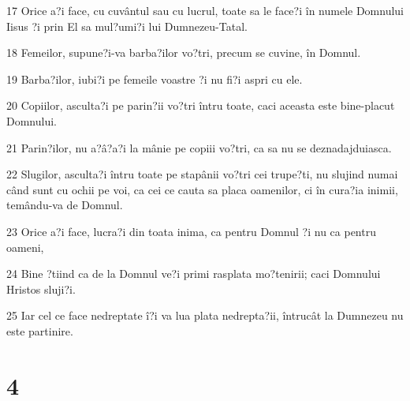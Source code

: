 \par 17 Orice a?i face, cu cuvântul sau cu lucrul, toate sa le face?i în numele Domnului Iisus ?i prin El sa mul?umi?i lui Dumnezeu-Tatal.
\par 18 Femeilor, supune?i-va barba?ilor vo?tri, precum se cuvine, în Domnul.
\par 19 Barba?ilor, iubi?i pe femeile voastre ?i nu fi?i aspri cu ele.
\par 20 Copiilor, asculta?i pe parin?ii vo?tri întru toate, caci aceasta este bine-placut Domnului.
\par 21 Parin?ilor, nu a?â?a?i la mânie pe copiii vo?tri, ca sa nu se deznadajduiasca.
\par 22 Slugilor, asculta?i întru toate pe stapânii vo?tri cei trupe?ti, nu slujind numai când sunt cu ochii pe voi, ca cei ce cauta sa placa oamenilor, ci în cura?ia inimii, temându-va de Domnul.
\par 23 Orice a?i face, lucra?i din toata inima, ca pentru Domnul ?i nu ca pentru oameni,
\par 24 Bine ?tiind ca de la Domnul ve?i primi rasplata mo?tenirii; caci Domnului Hristos sluji?i.
\par 25 Iar cel ce face nedreptate î?i va lua plata nedrepta?ii, întrucât la Dumnezeu nu este partinire.

\chapter{4}

